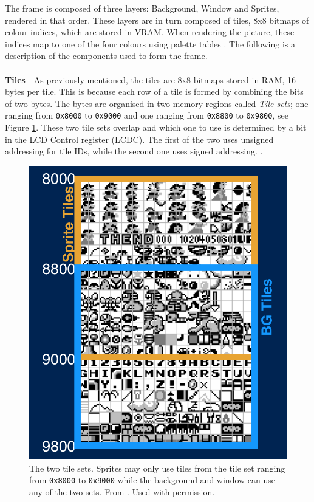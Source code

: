 The frame is composed of three layers: Background, Window and Sprites, rendered in that order. These layers are in turn composed of tiles, 8x8 bitmaps of colour indices, which are stored in VRAM. When rendering the picture, these indices map to one of the four colours using palette tables \cite{gameboyarchitecture}. The following is a description of the components used to form the frame.\\
\\
\textbf{Tiles} - 
As previously mentioned, the tiles are 8x8 bitmaps stored in RAM, 16 bytes per tile. This is because each row of a tile is formed by combining the bits of two bytes. The bytes are organised in two memory regions called \textit{Tile sets}; one ranging from \texttt{0x8000} to \texttt{0x9000} and one ranging from \texttt{0x8800} to \texttt{0x9800}, see Figure \ref{fig:ppu_tile_set}. These two tile sets overlap and which one to use is determined by a bit in the LCD Control register (LCDC). The first of the two uses unsigned addressing for tile IDs, while the second one uses signed addressing. \cite{gameboyarchitecture}.
\newpage
\begin{figure}[H]
    \centering
    \includegraphics[width=0.8\linewidth]{figures/PPU/PPU_tile_sets_divided.png}
    \caption{The two tile sets. Sprites may only use tiles from the tile set ranging from \texttt{0x8000} to \texttt{0x9000} while the background and window can use any of the two sets. From \cite{ultimateGBtalkSlides}. Used with permission.}
    \label{fig:ppu_tile_set}
\end{figure}
